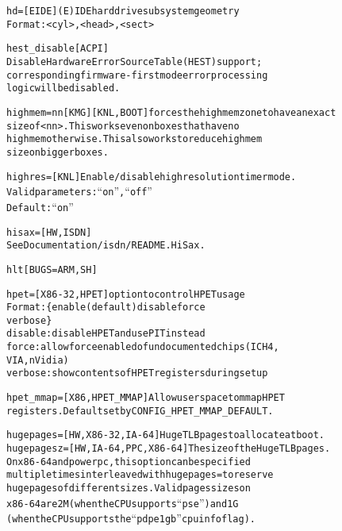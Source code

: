 \documentclass[a4paper,8pt,english]{sphinxmanual}
\begin{document}
\begin{alltt}
        hd=             {[}EIDE{]} (E)IDE hard drive subsystem geometry
                        Format: \textless{}cyl\textgreater{},\textless{}head\textgreater{},\textless{}sect\textgreater{}

        hest\_disable    {[}ACPI{]}
                        Disable Hardware Error Source Table (HEST) support;
                        corresponding firmware-first mode error processing
                        logic will be disabled.

        highmem=nn{[}KMG{]} {[}KNL,BOOT{]} forces the highmem zone to have an exact
                        size of \textless{}nn\textgreater{}. This works even on boxes that have no
                        highmem otherwise. This also works to reduce highmem
                        size on bigger boxes.

        highres=        {[}KNL{]} Enable/disable high resolution timer mode.
                        Valid parameters: ``on'', ``off''
                        Default: ``on''

        hisax=          {[}HW,ISDN{]}
                        See Documentation/isdn/README.HiSax.

        hlt             {[}BUGS=ARM,SH{]}

        hpet=           {[}X86-32,HPET{]} option to control HPET usage
                        Format: \{ enable (default) \textbar{} disable \textbar{} force \textbar{}
                                verbose \}
                        disable: disable HPET and use PIT instead
                        force: allow force enabled of undocumented chips (ICH4,
                                VIA, nVidia)
                        verbose: show contents of HPET registers during setup

        hpet\_mmap=      {[}X86, HPET\_MMAP{]} Allow userspace to mmap HPET
                        registers.  Default set by CONFIG\_HPET\_MMAP\_DEFAULT.

        hugepages=      {[}HW,X86-32,IA-64{]} HugeTLB pages to allocate at boot.
        hugepagesz=     {[}HW,IA-64,PPC,X86-64{]} The size of the HugeTLB pages.
                        On x86-64 and powerpc, this option can be specified
                        multiple times interleaved with hugepages= to reserve
                        huge pages of different sizes. Valid pages sizes on
                        x86-64 are 2M (when the CPU supports ``pse'') and 1G
                        (when the CPU supports the ``pdpe1gb'' cpuinfo flag).


\end{alltt}
\end{document}
